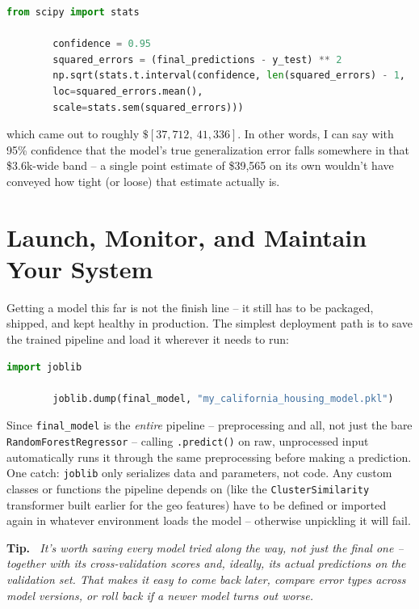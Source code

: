 \documentclass[11pt]{article}
\newenvironment{note}[1][Note]
{\par\vspace{4pt}\noindent\textbf{#1.}\itshape\ }
{\par\vspace{4pt}}
\begin{document}
	\begin{lstlisting}[language=Python]
		from scipy import stats
		
		confidence = 0.95
		squared_errors = (final_predictions - y_test) ** 2
		np.sqrt(stats.t.interval(confidence, len(squared_errors) - 1,
		loc=squared_errors.mean(),
		scale=stats.sem(squared_errors)))
	\end{lstlisting}
	
	which came out to roughly $\$[37{,}712,\ 41{,}336]$. In other words, I can say with 95\% confidence that the model's true generalization error falls somewhere in that \$3.6k-wide band -- a single point estimate of \$39,565 on its own wouldn't have conveyed how tight (or loose) that estimate actually is.
	
	\section{Launch, Monitor, and Maintain Your System}
	
	Getting a model this far is not the finish line -- it still has to be packaged, shipped, and kept healthy in production. The simplest deployment path is to save the trained pipeline and load it wherever it needs to run:
	
	\begin{lstlisting}[language=Python]
		import joblib
		
		joblib.dump(final_model, "my_california_housing_model.pkl")
	\end{lstlisting}
	
	Since \texttt{final\_model} is the \emph{entire} pipeline -- preprocessing and all, not just the bare \texttt{RandomForestRegressor} -- calling \texttt{.predict()} on raw, unprocessed input automatically runs it through the same preprocessing before making a prediction. One catch: \texttt{joblib} only serializes data and parameters, not code. Any custom classes or functions the pipeline depends on (like the \texttt{ClusterSimilarity} transformer built earlier for the geo features) have to be defined or imported again in whatever environment loads the model -- otherwise unpickling it will fail.
	
	\begin{note}[Tip]
		It's worth saving every model tried along the way, not just the final one -- together with its cross-validation scores and, ideally, its actual predictions on the validation set. That makes it easy to come back later, compare error types across model versions, or roll back if a newer model turns out worse.
	\end{note}
	
\end{document}
